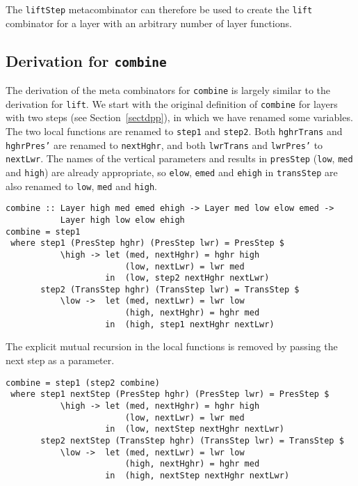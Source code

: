 The \texttt{liftStep} metacombinator can therefore be used to create the \texttt{lift} combinator for a layer with an arbitrary number of layer functions.


%																
\subsection{Derivation for \texttt{combine}} \label{subsubsectcombine}

The derivation of the meta combinators for \texttt{combine} is largely similar to the derivation for \texttt{lift}. We start with the original definition of \texttt{combine} for layers with two steps (see Section~\ref{sectdpp}), in which we have renamed some variables. The two local functions are renamed to \texttt{step1} and \texttt{step2}. Both \texttt{hghrTrans} and \texttt{hghrPres'} are renamed to \texttt{nextHghr}, and both \texttt{lwrTrans} and \texttt{lwrPres'} to \texttt{nextLwr}. The names of the vertical parameters and results in \texttt{presStep} (\texttt{low}, \texttt{med} and \texttt{high}) are already appropriate, so \texttt{elow}, \texttt{emed} and \texttt{ehigh} in \texttt{transStep} are also renamed to \texttt{low}, \texttt{med} and \texttt{high}.

\begin{small}
\begin{verbatim}
combine :: Layer high med emed ehigh -> Layer med low elow emed -> 
           Layer high low elow ehigh
combine = step1
 where step1 (PresStep hghr) (PresStep lwr) = PresStep $
           \high -> let (med, nextHghr) = hghr high
                        (low, nextLwr) = lwr med
                    in  (low, step2 nextHghr nextLwr)
       step2 (TransStep hghr) (TransStep lwr) = TransStep $
           \low ->  let (med, nextLwr) = lwr low
                        (high, nextHghr) = hghr med
                    in  (high, step1 nextHghr nextLwr)
\end{verbatim}
\end{small}

The explicit mutual recursion in the local functions is removed by passing the next step as a parameter.

\begin{small}
\begin{verbatim}
combine = step1 (step2 combine)
 where step1 nextStep (PresStep hghr) (PresStep lwr) = PresStep $
           \high -> let (med, nextHghr) = hghr high
                        (low, nextLwr) = lwr med
                    in  (low, nextStep nextHghr nextLwr)
       step2 nextStep (TransStep hghr) (TransStep lwr) = TransStep $
           \low ->  let (med, nextLwr) = lwr low
                        (high, nextHghr) = hghr med
                    in  (high, nextStep nextHghr nextLwr)
\end{verbatim}
\end{small}

